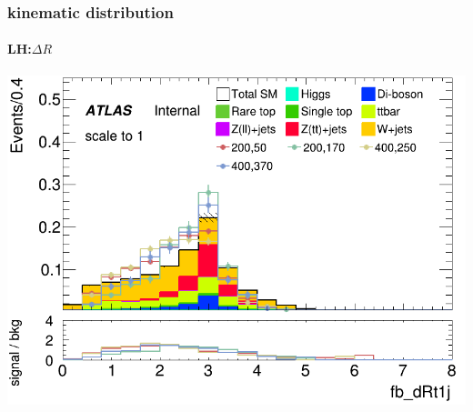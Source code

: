 \documentclass[usenames,dvipsnames]{beamer}
\begin{document}
\begin{frame}
  \frametitle{kinematic distribution}
  \framesubtitle{LH:$\Delta R$}
    \begin{minipage}{0.32\textwidth}
        \centering
        \includegraphics[width=\textwidth]{graphics/LH_met_sig/LH_fb_dRt1j_norm.png}
    \end{minipage}
    \hfill
    \begin{minipage}{0.32\textwidth}
        \centering
        \setlength{\fboxsep}{0pt} %
        \setlength{\fboxrule}{1pt} %
    \end{minipage}
    \hfill
    \begin{minipage}{0.32\textwidth}

\end{minipage}
\end{frame}
\end{document}
